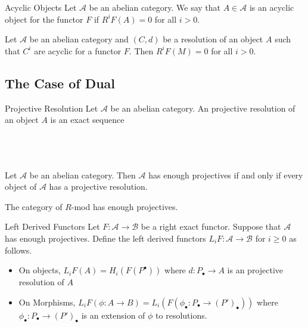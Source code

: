 \documentclass[a4paper]{article}
\begin{document}
\begin{defn}{Acyclic Objects}{} Let $\mathcal{A}$ be an abelian category. We say that $A\in\mathcal{A}$ is an acyclic object for the functor $F$ if $R^iF(A)=0$ for all $i>0$. 
\end{defn}

\begin{prp}{}{} Let $\mathcal{A}$ be an abelian category and $(C,d)$ be a resolution of an object $A$ such that $C^i$ are acyclic for a functor $F$. Then $R^iF(M)=0$ for all $i>0$. 
\end{prp}

\subsection{The Case of Dual}
\begin{defn}{Projective Resolution}{} Let $\mathcal{A}$ be an abelian category. An projective resolution of an object $A$ is an exact sequence \\~\\
\\~\\
\end{defn}

\begin{thm}{}{} Let $\mathcal{A}$ be an abelian category. Then $\mathcal{A}$ has enough projectives if and only if every object of $\mathcal{A}$ has a projective resolution. 
\end{thm}

\begin{thm}{}{} The category of $R$-mod has enough projectives.
\end{thm}

\begin{defn}{Left Derived Functors}{} Let $F:\mathcal{A}\to\mathcal{B}$ be a right exact functor. Suppose that $\mathcal{A}$ has enough projectives. Define the left derived functors $L_iF:\mathcal{A}\to\mathcal{B}$ for $i\geq 0$ as follows. 
\begin{itemize}
\item On objects, $L_iF(A)=H_i(F(P^\bullet))$ where $d:P_\bullet\to A$ is an projective resolution of $A$
\item On Morphisms, $L_iF(\phi:A\to B)=L_i(F(\phi_\bullet:P_\bullet\to (P')_\bullet))$ where $\phi_\bullet:P_\bullet\to(P')_\bullet$ is an extension of $\phi$ to resolutions. 
\end{itemize}
\end{defn}
\end{document}
